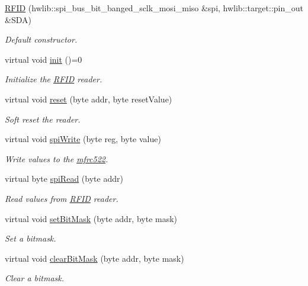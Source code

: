 \begin{DoxyCompactItemize}
\item 
\hyperlink{class_r_f_i_d_ad893852fc8a7c6a975a42cf3db951857}{R\+F\+ID} (hwlib\+::spi\+\_\+bus\+\_\+bit\+\_\+banged\+\_\+sclk\+\_\+mosi\+\_\+miso \&spi, hwlib\+::target\+::pin\+\_\+out \&S\+DA)
\begin{DoxyCompactList}\small\item\em Default constructor. \end{DoxyCompactList}\item 
virtual void \hyperlink{class_r_f_i_d_a8b244d38edcafaeb06637dbf33b5656f}{init} ()=0
\begin{DoxyCompactList}\small\item\em Initialize the \hyperlink{class_r_f_i_d}{R\+F\+ID} reader. \end{DoxyCompactList}\item 
virtual void \hyperlink{class_r_f_i_d_a3f1242db1a6bb7b57d6bfb7111d1fadd}{reset} (byte addr, byte reset\+Value)
\begin{DoxyCompactList}\small\item\em Soft reset the reader. \end{DoxyCompactList}\item 
virtual void \hyperlink{class_r_f_i_d_a44da5195bf18d4882f1b691904e993b6}{spi\+Write} (byte reg, byte value)
\begin{DoxyCompactList}\small\item\em Write values to the \hyperlink{classmfrc522}{mfrc522}. \end{DoxyCompactList}\item 
virtual byte \hyperlink{class_r_f_i_d_ac9d2c7f3589feef21aba37a95354c6c2}{spi\+Read} (byte addr)
\begin{DoxyCompactList}\small\item\em Read values from \hyperlink{class_r_f_i_d}{R\+F\+ID} reader. \end{DoxyCompactList}\item 
virtual void \hyperlink{class_r_f_i_d_af8a78df3f2b79c1ffc8ea660693f43ec}{set\+Bit\+Mask} (byte addr, byte mask)
\begin{DoxyCompactList}\small\item\em Set a bitmask. \end{DoxyCompactList}\item 
virtual void \hyperlink{class_r_f_i_d_afa2560b026553dac1f6aa20d17f47438}{clear\+Bit\+Mask} (byte addr, byte mask)
\begin{DoxyCompactList}\small\item\em Clear a bitmask. \end{DoxyCompactList}\item 

\end{DoxyCompactItemize}
